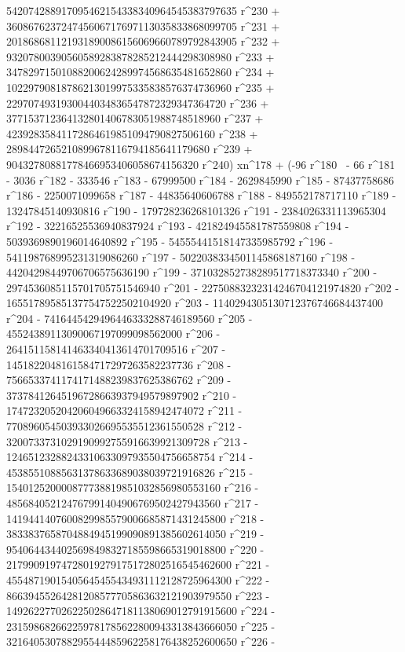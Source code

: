        542074288917095462154338340964545383797635 r^230 + 
       360867623724745606717697113035833868099705 r^231 + 
       201868681121931890086156069660789792843905 r^232 + 
       93207800390560589283878285212444298308980 r^233 + 
       34782971501088200624289974568635481652860 r^234 + 
       10229790818786213019975335838576374736960 r^235 + 
       2297074931930044034836547872329347364720 r^236 + 
       377153712364132801406783051988748518960 r^237 + 
       42392835841172864619851094790827506160 r^238 + 
       2898447265210899678116794185641179680 r^239 + 
       90432780881778466953406058674156320 r^240) xn^178 + (-96 r^180 \
- 66 r^181 - 3036 r^182 - 333546 r^183 - 67999500 r^184 - 
       2629845990 r^185 - 87437758686 r^186 - 2250071099658 r^187 - 
       44835640606788 r^188 - 849552178717110 r^189 - 
       13247845140930816 r^190 - 179728236268101326 r^191 - 
       2384026331113965304 r^192 - 32216525536940837924 r^193 - 
       421824945581787559808 r^194 - 5039369890196014640892 r^195 - 
       54555441518147335985792 r^196 - 
       541198768995231319086260 r^197 - 
       5022038334501145868187160 r^198 - 
       44204298449706706575636190 r^199 - 
       371032852738289517718373340 r^200 - 
       2974536085115701705751546940 r^201 - 
       22750883232314246704121974820 r^202 - 
       165517895851377547522502104920 r^203 - 
       1140294305130712376746684437400 r^204 - 
       7416445429496446333288746189560 r^205 - 
       45524389113090067197099098562000 r^206 - 
       264151158141463340413614701709516 r^207 - 
       1451822048161584717297263582237736 r^208 - 
       7566533741174171488239837625386762 r^209 - 
       37378412645196728663937949579897902 r^210 - 
       174723205204206049663324158942474072 r^211 - 
       770896054503933026695535512361550528 r^212 - 
       3200733731029190992755916639921309728 r^213 - 
       12465123288243310633097935504756658754 r^214 - 
       45385510885631378633689038039721916826 r^215 - 
       154012520000877738819851032856980553160 r^216 - 
       485684052124767991404906769502427943560 r^217 - 
       1419441407600829985579006685871431245800 r^218 - 
       3833837658704884945199090891385602614050 r^219 - 
       9540644344025698498327185598665319018800 r^220 - 
       21799091974728019279175172802516545462600 r^221 - 
       45548719015405645455434931112128725964300 r^222 - 
       86639455264281208577705863632121903979550 r^223 - 
       149262277026225028647181138069012791915600 r^224 - 
       231598682662259781785622800943313843666050 r^225 - 
       321640530788295544485962258176438252600650 r^226 - 
